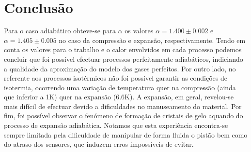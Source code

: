 \section{Conclusão}
\par Para o caso adiabático obteve-se para $\alpha$ os valores $\alpha=1.400\pm0.002$ e $\alpha=1.405\pm0.005$ no caso da compressão e expansão, respectivamente. Tendo em conta os valores para o trabalho e o calor envolvidos em cada processo podemos concluir que foi possível efectuar processos perfeitamente adiabáticos, indiciando a qualidade da aproximação do modelo dos gases perfeitos. Por outro lado, no referente aos processos isotérmicos não foi possível garantir as condições de isotermia, ocorrendo uma variação de temperatura quer na compressão (ainda que inferior a 1K) quer na expansão (6.6K). A expansão, em geral, revelou-se mais difícil de efectuar devido a dificuldades no manuseamento do material. Por fim, foi possível observar o fenómeno de formação de cristais de gelo aquando do processo de expansão adiabática. Notamos que esta experiência encontra-se sempre limitada pela dificuldade de manipular de forma fluida o pistão bem como do atraso dos sensores, que induzem erros impossíveis de evitar.